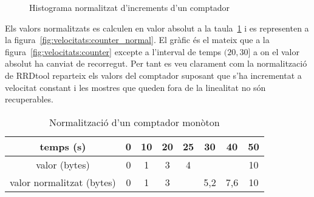 \begin{figure}[tbp]
  \centering
  \caption{Histograma normalitzat d'increments d'un comptador}
  \label{fig:velocitats:histograma_normal}
\end{figure}

Els valors normalitzats es calculen en valor absolut a la taula~\ref{tab:velocitats:counter_normal} i es representen a la figura~\ref{fig:velocitats:counter_normal}.  El gràfic és el mateix que a la figura~\ref{fig:velocitats:counter} excepte a l'interval de temps $(20,30]$ a on el valor absolut ha canviat de recorregut. Per tant es veu clarament com la normalització de RRDtool reparteix els valors del comptador suposant que s'ha incrementat a velocitat constant i les mostres que queden fora de la linealitat no són recuperables. 


\begin{table}[tbp]
\centering
\begin{tabular}{c|ccccccc}
  temps (s) &  0 & 10 & 20 &25 & 30 & 40 & 50 \\ \hline
valor (bytes)& 0 & 1 & 3 & 4 & & & 10 \\ 
valor normalitzat (bytes)& 0 & 1 & 3 &  & 5,2 & 7,6 & 10
\end{tabular}
\caption{Normalització d'un comptador monòton}
\label{tab:velocitats:counter_normal}
\end{table}

